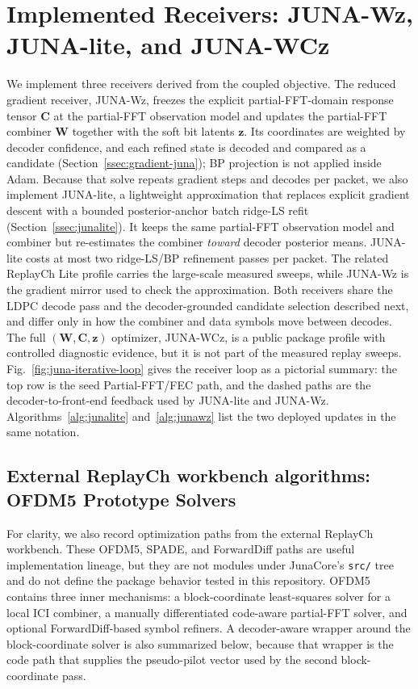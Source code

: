 \documentclass[journal]{IEEEtran}
\newcommand{\junalite}{JUNA-lite}
\newcommand{\junawz}{JUNA-Wz}
\newcommand{\junawcz}{JUNA-WCz}
\begin{document}
\section{Implemented Receivers: \texorpdfstring{\junawz{}}{JUNA-Wz},
\texorpdfstring{\junalite{}}{JUNA-lite}, and
\texorpdfstring{\junawcz{}}{JUNA-WCz}}\label{sec:solver}
We implement three receivers derived from the coupled objective. The
reduced gradient receiver, \junawz{}, freezes the explicit partial-FFT-domain response
tensor $\mathbf C$ at the partial-FFT observation model and updates the
partial-FFT combiner $\mathbf W$ together with the soft bit latents $\mathbf z$.
Its coordinates are weighted by decoder confidence, and each refined state is
decoded and compared as a candidate (Section~\ref{ssec:gradient-juna}); BP
projection is not applied inside Adam.
Because that solve repeats gradient steps and decodes per packet, we also
implement \junalite{}, a lightweight approximation that replaces explicit
gradient descent with a bounded posterior-anchor batch ridge-LS refit
(Section~\ref{ssec:junalite}). It keeps the same partial-FFT observation model
and combiner but re-estimates the combiner \emph{toward} decoder posterior means.
\junalite{} costs at most two ridge-LS/BP refinement passes per packet. The
related ReplayCh Lite profile carries the large-scale measured sweeps, while
\junawz{} is the gradient mirror used to check the approximation. Both receivers
share the LDPC decode pass and the decoder-grounded candidate selection
described next, and differ only in how the combiner and data symbols move
between decodes. The full $(\mathbf W,\mathbf C,\mathbf z)$ optimizer,
\junawcz{}, is a public package profile with controlled diagnostic evidence,
but it is not part of the measured replay sweeps.
Fig.~\ref{fig:juna-iterative-loop} gives the receiver loop as a pictorial
summary: the top row is the seed Partial-FFT/FEC path, and the dashed paths are
the decoder-to-front-end feedback used by \junalite{} and \junawz{}.
Algorithms~\ref{alg:junalite} and~\ref{alg:junawz} list the two deployed
updates in the same notation.

\subsection{External ReplayCh workbench algorithms: OFDM5 Prototype Solvers}
\label{ssec:ofdm5-prototypes}
For clarity, we also record optimization paths from the external ReplayCh
workbench. These OFDM5, SPADE, and ForwardDiff paths are useful implementation
lineage, but they are not modules under JunaCore's \texttt{src/} tree and do not
define the package behavior tested in this repository. OFDM5 contains
three inner mechanisms: a block-coordinate least-squares solver for a local ICI
combiner, a manually differentiated code-aware partial-FFT solver, and optional
ForwardDiff-based symbol refiners. A decoder-aware wrapper around the
block-coordinate solver is also summarized below, because that wrapper is the
code path that supplies the pseudo-pilot vector used by the second
block-coordinate pass.
\end{document}
